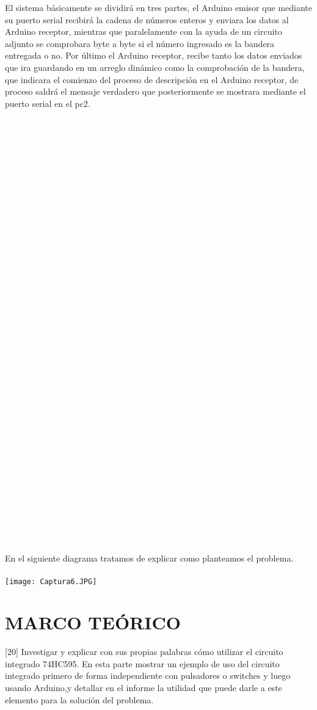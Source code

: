 \documentclass{article}
\begin{document}
El sistema básicamente se dividirá en tres partes, el Arduino emisor que mediante su puerto serial recibirá la cadena de números enteros y enviara los datos al Arduino receptor, mientras que paralelamente con la ayuda de un circuito adjunto se comprobara byte a byte si el número ingresado es la bandera entregada o no. Por último el Arduino receptor, recibe tanto los datos enviados que ira guardando en un arreglo dinámico como la comprobación de la bandera, que indicara el comienzo del proceso de descripción en el Arduino receptor, de proceso saldrá el mensaje verdadero que posteriormente se mostrara mediante el puerto serial en el pc2.\\
\\
\\
\\
\\
\\
\\
\\
\\
\\
\\
\\
\\
\\
\\
\\
\\
\\
\\
\\
\\
\\
\\
\\
\\
\\
\\
\\
\\
\\
\\
\\
\\
\\
\\
\\
\\
\\
En el siguiente diagrama tratamos de explicar como planteamos el problema.\\
\\
\texttt{[image: Captura6.JPG]}\\


\newpage
\section{MARCO TEÓRICO}
\label{marco}
[20] Investigar y explicar con sus propias palabras cómo utilizar el circuito integrado 74HC595. En esta parte mostrar un ejemplo de uso del circuito integrado primero de forma independiente con pulsadores o switches y luego usando Arduino,y detallar en el informe la utilidad que puede darle a este elemento para la solución del problema.\\
\end{document}
